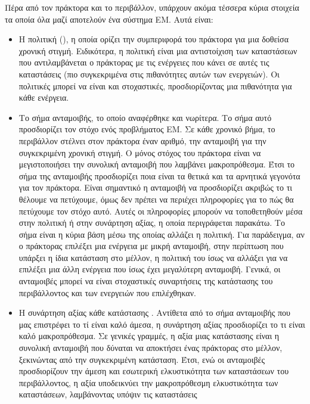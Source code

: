 Πέρα από τον πράκτορα και το περιβάλλον, υπάρχουν ακόμα τέσσερα κύρια στοιχεία τα οποία όλα μαζί αποτελούν
ένα σύστημα ΕΜ. Αυτά είναι:
\begin{itemize}
    \item Η πολιτική (), η οποία ορίζει την συμπεριφορά του πράκτορα για μια δοθείσα
          χρονική στιγμή. Ειδικότερα, η πολιτική είναι μια αντιστοίχιση των καταστάσεων
          που αντιλαμβάνεται ο πράκτορας με τις ενέργειες που κάνει σε αυτές τις καταστάσεις (πιο συγκεκριμένα στις πιθανότητες αυτών των ενεργειών). Οι
          πολιτικές μπορεί να είναι και στοχαστικές, προσδιορίζοντας μια πιθανότητα για κάθε ενέργεια.
    \item Το σήμα ανταμοιβής, το οποίο αναφέρθηκε και νωρίτερα. Το σήμα αυτό προσδιορίζει τον στόχο ενός προβλήματος
          ΕΜ. Σε κάθε χρονικό βήμα, το περιβάλλον στέλνει στον πράκτορα έναν αριθμό, την ανταμοιβή για την συγκεκριμένη χρονική στιγμή.
          Ο μόνος στόχος του πράκτορα είναι να μεγιστοποιήσει την συνολική ανταμοιβή που λαμβάνει
          μακροπρόθεσμα. Έτσι το σήμα της ανταμοιβής προσδιορίζει ποια είναι τα θετικά και τα αρνητικά
          γεγονότα για τον πράκτορα. Είναι σημαντικό η ανταμοιβή να προσδιορίζει ακριβώς το
          τι θέλουμε να πετύχουμε, όμως δεν πρέπει να περιέχει πληροφορίες για το πώς θα πετύχουμε τον στόχο αυτό.
          Αυτές οι πληροφορίες μπορούν να τοποθετηθούν μέσα στην πολιτική ή στην συνάρτηση αξίας, η οποία περιγράφεται παρακάτω.
          Το σήμα είναι η κύρια βάση μέσω της οποίας αλλάζει η πολιτική.
          Για παράδειγμα, αν ο πράκτορας επιλέξει μια ενέργεια με μικρή ανταμοιβή, στην περίπτωση που υπάρξει η ίδια κατάσταση στο μέλλον,
          η πολιτική του ίσως να αλλάξει για να επιλέξει μια άλλη ενέργεια που ίσως έχει μεγαλύτερη ανταμοιβή. Γενικά, οι
          ανταμοιβές μπορεί να είναι στοχαστικές συναρτήσεις της κατάστασης του περιβάλλοντος και των
          ενεργειών που επιλέχθηκαν.
    \item Η συνάρτηση αξίας κάθε κατάστασης . Αντίθετα από το σήμα
          ανταμοιβής που μας επιστρέφει το τί είναι καλό άμεσα, η συνάρτηση αξίας προσδιορίζει το τι είναι καλό μακροπρόθεσμα.
          Σε γενικές γραμμές, η αξία μιας κατάστασης είναι η συνολική ανταμοιβή που δύναται
          να αποκτήσει ένας πράκτορας στο μέλλον, ξεκινώντας από την συγκεκριμένη κατάσταση. Έτσι,
          ενώ οι ανταμοιβές προσδιορίζουν την άμεση και εσωτερική ελκυστικότητα των καταστάσεων του περιβάλλοντος,
          η αξία υποδεικνύει την μακροπρόθεσμη ελκυστικότητα των καταστάσεων, λαμβάνοντας υπόψιν τις καταστάσεις

\end{itemize}
